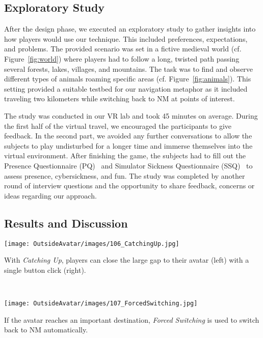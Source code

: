 \documentclass[sigchi-a, authorversion]{acmart}
\newcommand{\comm}[1]{}
\begin{document}
\subsection{Exploratory Study}
After the design phase, we executed an exploratory study to gather insights into how players would use our technique. This included preferences, expectations, and problems. The provided scenario was set in a fictive medieval world (cf. Figure~\ref{fig:world}) where players had to follow a long, twisted path passing several forests, lakes, villages, and mountains. The task was to find and observe different types of animals roaming specific areas (cf. Figure~\ref{fig:animals}). This setting provided a suitable testbed for our navigation metaphor as it included traveling two kilometers while switching back to NM at points of interest.\par


The study was conducted in our VR lab and took 45 minutes on average. \comm{After assessing the general familiarity with VR games, we introduced the subjects to our setup and started the game.} During the first half of the virtual travel, we encouraged the participants to give feedback. In the second part, we avoided any further conversations to allow the subjects to play undisturbed for a longer time and immerse themselves into the virtual environment. After finishing the game, the subjects had to fill out the Presence Questionnaire (PQ)~\cite{UQO.2004} and Simulator Sickness Questionnaire (SSQ)~\cite{kennedy1993simulator} to assess presence, cybersickness, and fun. The study was completed by another round of interview questions and the opportunity to share feedback, concerns or ideas regarding our approach.

\subsection{Results and Discussion}

\begin{marginfigure}
    \texttt{[image: OutsideAvatar/images/106\_CatchingUp.jpg]}
    \caption{With \textit{Catching Up}, players can close the large gap to their avatar (left) with a single button click (right).}~\label{fig:catchingUp}
\end{marginfigure}

\begin{marginfigure}
    \texttt{[image: OutsideAvatar/images/107\_ForcedSwitching.jpg]}
    \caption{If the avatar reaches an important destination, \textit{Forced Switching} is used to switch back to NM automatically.}~\label{fig:forcedSwitching}
\end{marginfigure}
\end{document}
